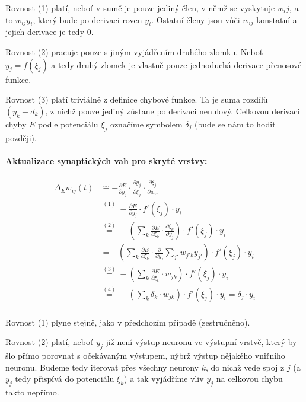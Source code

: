 \documentclass[11pt]{report} %
\numberwithin{equation}{section}
\begin{document}
Rovnost (1) platí, neboť v sumě je pouze jediný člen, v němž se vyskytuje  $w_ij$, a to $w_{ij}y_i$, který bude po derivaci roven $y_i$. Ostatní členy jsou vůči $w_{ij}$ konstatní a jejich derivace je tedy 0.

Rovnost (2) pracuje pouze s jiným vyjádřením druhého zlomku. Neboť $y_j = f(\xi_j)$ a tedy druhý zlomek je vlastně pouze jednoduchá derivace přenosové funkce.

Rovnost (3) platí triviálně z definice chybové funkce. Ta je suma rozdílů $(y_k - d_k)$, z nichž pouze jediný zůstane po derivaci nenulový. Celkovou derivaci chyby $E$ podle potenciálu $\xi_j$ označíme symbolem $\delta_j$ (bude se nám to hodit později).

\paragraph{Aktualizace synaptických vah pro skryté vrstvy:}
\begin{align*}
\Delta_E w_{ij}(t) 
&\cong -\frac{\partial E}{\partial y_j} \cdot \frac{\partial y_j}{\partial \xi_j} \cdot \frac{\partial \xi_j}{\partial w_{ij}}\\
&\stackrel{(1)}{=} -\frac{\partial E}{\partial y_j} \cdot f'(\xi_j) \cdot y_i\\
&\stackrel{(2)}{=} -\left(\sum\limits_k\frac{\partial E}{\partial\xi_k}\cdot\frac{\partial\xi_k}{\partial y_j} \right) \cdot f'(\xi_j) \cdot y_i \\
&= -\left(\sum\limits_k\frac{\partial E}{\partial\xi_k}\cdot\frac{\partial}{\partial y_j}\sum\limits_{j'}w_{j'k}y_{j'} \right) \cdot f'(\xi_j) \cdot y_i \\
&\stackrel{(3)}{=} -\left(\sum\limits_k\frac{\partial E}{\partial\xi_k}\cdot w_{jk} \right) \cdot f'(\xi_j) \cdot y_i \\
&\stackrel{(4)}{=} -\left(\sum\limits_k \delta_k\cdot w_{jk} \right) \cdot f'(\xi_j) \cdot y_i = \delta_j \cdot y_i\\
\end{align*}

Rovnost (1) plyne stejně, jako v předchozím případě (zestručněno). 

Rovnost (2) platí, neboť $y_j$ již není výstup neuronu ve výstupní vrstvě, který by šlo přímo porovnat s očekávaným výstupem, nýbrž výstup nějakého vniřního neuronu. Budeme tedy iterovat přes všechny neurony $k$, do nichž vede spoj z $j$ (a $y_j$ tedy přispívá do potenciálu $\xi_k$) a tak vyjádříme vliv $y_j$ na celkovou chybu takto nepřímo. 
\end{document}
